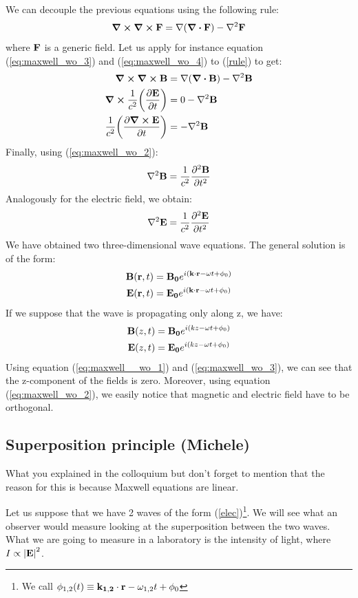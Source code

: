 \documentclass[11pt,a4paper]{article}
\begin{document}
We can decouple the previous equations using the following rule:
\begin{equation}
\curl \curl \vb{F}=\nabla (\div \vb{F})- \nabla^2\vb{F}\label{rule}
\end{equation}
where $\vb{F}$ is a generic field. Let us apply for instance equation (\ref{eq:maxwell_wo_3}) and (\ref{eq:maxwell_wo_4}) to (\ref{rule}) to get:
\begin{align*}
\curl \curl \vb{B} &=\nabla (\div \vb{B})- \nabla^2\vb{B} \\
\curl \frac{1}{c^2}\qty(\pdv{\vb{E}}{t}) &=0-\nabla^2\vb{B} \\
\frac{1}{c^2}\qty(\pdv{\curl \vb{E}}{t}) &=-\nabla^2\vb{B}
\end{align*}
Finally, using (\ref{eq:maxwell_wo_2}):
\begin{equation}
\nabla^2\vb{B}=\frac{1}{c^2}\pdv{^2 \vb{B}}{t^2}
\end{equation}
Analogously for the electric field, we obtain:
\begin{equation}
\nabla^2\vb{E}=\frac{1}{c^2}\pdv{^2 \vb{E}}{t^2}
\end{equation}
We have obtained two three-dimensional wave equations. The general solution is of the form:
\begin{align}
\vb{B}(\vb{r},t) &=\vb{B_0}e^{i(\vb{k} \cdot \vb{r}-\omega t+\phi_0)}\\
\vb{E}(\vb{r},t) &=\vb{E_0}e^{i(\vb{k} \cdot \vb{r}-\omega t+\phi_0)}\label{elec}
\end{align}
If we suppose that the wave is propagating only along z, we have:
\begin{align}
\vb{B}(z,t) &=\vb{B_0}e^{i(kz-\omega t+\phi_0)}\\
\vb{E}(z,t) &=\vb{E_0}e^{i(kz-\omega t+\phi_0)}
\end{align}
Using equation (\ref{eq:maxwell__wo_1}) and (\ref{eq:maxwell_wo_3}), we can see that the z-component of the fields is zero. Moreover, using equation (\ref{eq:maxwell_wo_2}), we easily notice that magnetic and electric field have to be orthogonal.
\subsection{Superposition principle (Michele)}
What you explained in the colloquium but don't forget to mention that the reason for this is because Maxwell equations are linear.

Let us suppose that we have 2 waves of the form (\ref{elec})\footnote{We call $\phi_{1,2}(t)\equiv\vb{k_{1,2}} \cdot \vb{r}-\omega_{1,2} t+\phi_0$}. We will see what an observer would measure looking at the superposition between the two waves. What we are going to measure in a laboratory is the intensity of light, where $I\propto \abs{\vb{E}}^2$.
\end{document}
